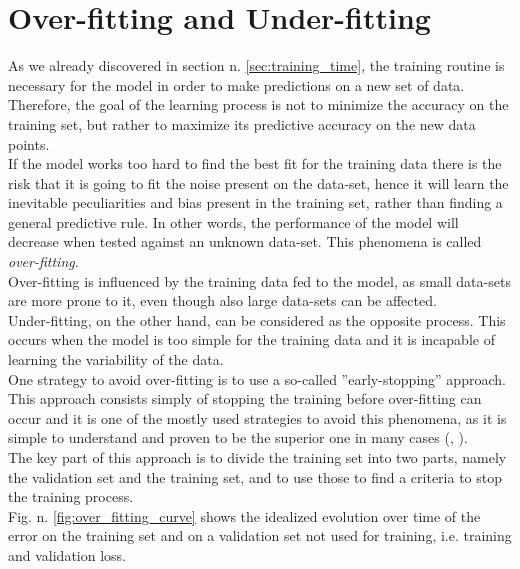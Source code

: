 



\section{Over-fitting and Under-fitting }\label{sec:of_uf}
As we already discovered in section n. \ref{sec:training_time}, the training routine is necessary for the model in order to make predictions on a new set of data. Therefore, the goal of the learning process is not to minimize the accuracy on the training set, but rather to maximize its predictive accuracy on the new data points. \citep{dietterich1995overfitting}\\
If the model works too hard to find the best fit for the training data there is the risk that it is going to fit the noise present on the data-set, hence it will learn the inevitable peculiarities and bias present in the training set, rather than finding a general predictive rule. In other words, the performance of the model will decrease when tested against an unknown data-set.\cite{jabbar2015methods} This phenomena is called \textit{over-fitting}. \citep{dietterich1995overfitting}\\
Over-fitting is influenced by the training data fed to the model, as small data-sets are more prone to it, even though also large data-sets can be affected. \cite{10.1016/j.inffus.2008.11.003}\\
Under-fitting, on the other hand, can be considered as the opposite process. This occurs when the model is too simple for the training data and it is incapable of learning the variability of the data. \cite{10.1016/j.inffus.2008.11.003}\\

One strategy to avoid over-fitting is to use a so-called ''early-stopping'' approach. This approach consists simply of stopping the training before over-fitting can occur and it is one of the mostly used strategies to avoid this phenomena, as it is simple to understand and proven to be the superior one in many cases (\citep{FINNOFF1993771}, \cite{early_stopping}). \\
The key part of this approach is to divide the training set into two parts, namely the validation set and the training set, and to use those to find a criteria to stop the training process. \\
Fig. n. \ref{fig:over_fitting_curve} shows the idealized evolution over time of the error on the training set and on a validation set not used for training, i.e. training and validation loss.\cite{early_stopping}

